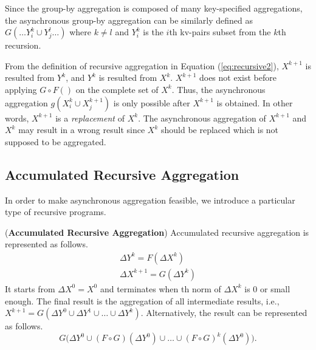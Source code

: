 Since the group-by aggregation is composed of many key-specified aggregations, the asynchronous group-by aggregation can be similarly defined as $G(\ldots Y_{i}^k\cup Y_{j}^{l}\ldots)$ where $k\neq l$ and $Y_i^k$ is the $i$th kv-pairs subset from the $k$th recursion.


From the definition of recursive aggregation in Equation (\ref{eq:recursive2}), $X^{k+1}$ is resulted from $Y^k$, and $Y^k$ is resulted from $X^k$. $X^{k+1}$ does not exist before applying $G\circ F()$ on the complete set of $X^k$. Thus, the asynchronous aggregation $g(X_i^k\cup X_j^{k+1})$ is only possible after $X^{k+1}$ is obtained. In other words, $X^{k+1}$ is a \emph{replacement} of $X^k$. The asynchronous aggregation of $X^{k+1}$ and $X^k$ may result in a wrong result since $X^k$ should be replaced which is not supposed to be aggregated.

\subsection{Accumulated Recursive Aggregation}
\label{sec:async:accrec}

In order to make asynchronous aggregation feasible, we introduce a particular type of recursive programs.

\begin{definition}
	\label{def:accumasync}
	(\textbf{Accumulated Recursive Aggregation}) Accumulated recursive aggregation is represented as follows.
	\begin{equation}\label{eq:accumasync}
	\begin{aligned}
	\Delta Y^{k}= F(\Delta X^k)\\
	\Delta X^{k+1}= G(\Delta Y^{k})
	\end{aligned}
	\end{equation}
	It starts from $\Delta X^0=X^0$ and terminates when th norm of $\Delta X^k$ is 0 or small enough. The final result is the aggregation of all intermediate results, i.e., $X^{k+1}=G(\Delta Y^{0} \cup \Delta Y^{1} \cup \ldots \cup \Delta Y^{k})$. Alternatively, the result can be represented as follows.
	\begin{equation}
	\label{eq:accumasyncres}
	G\Big(\Delta Y^0\cup (F\circ G)(\Delta Y^0)\cup\ldots\cup (F\circ G)^k(\Delta Y^0)\Big).
	\end{equation}
\end{definition}

